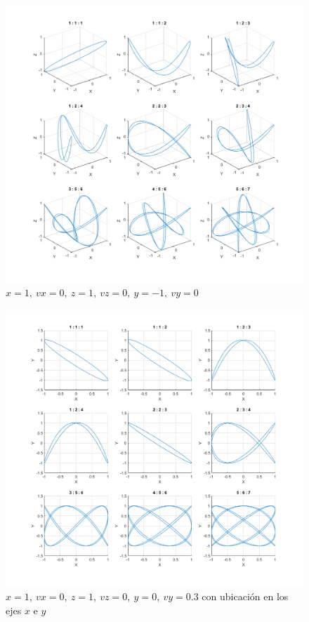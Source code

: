 \documentclass{article}
\begin{document}
\clearpage
\newpage

\begin{figure}
\centering
    \includegraphics[width=1\textwidth]{images/03d1.png}
    \caption{$x = 1,~vx = 0,~z = 1,~vz = 0,~y =-1,~vy = 0$}
\end{figure}

\clearpage
\newpage

\begin{figure}
\centering
    \includegraphics[width=1\textwidth]{images/03d2.png}
    \caption{$x = 1,~vx = 0,~z = 1,~vz = 0,~y = 0,~vy = 0.3$ con ubicación en los ejes $x$ e $y$}
\end{figure}
\end{document}
